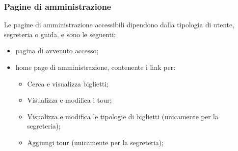 \documentclass[10pt,a4paper,onecolumn]{article}
\begin{document}
 \subsubsection{Pagine di amministrazione}
 Le pagine di amministrazione accessibili dipendono dalla tipologia di utente, segreteria o guida, e sono le seguenti:
 \begin{itemize}
 \item pagina di avvenuto accesso;
 \item home page di amministrazione, contenente i link per:
    \begin{itemize}
	\item Cerca e visualizza biglietti;
    \item Visualizza e modifica i tour;
	\item Visualizza e modifica le tipologie di biglietti (unicamente per la segreteria);
	\item Aggiungi tour (unicamente per la segreteria);
 	\end{itemize}
 \end{itemize}

\clearpage
\end{document}
